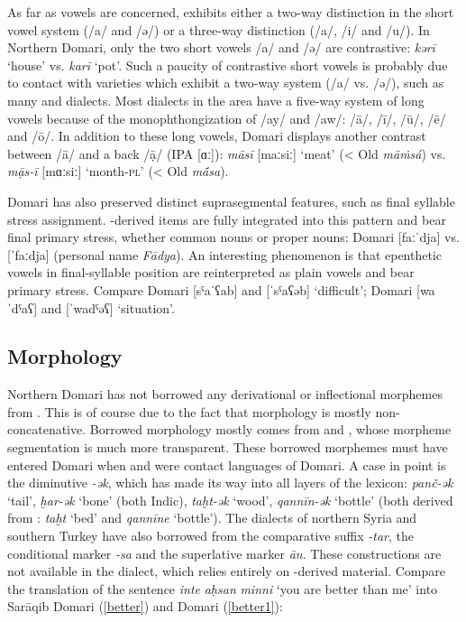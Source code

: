\documentclass[output=paper]{langsci/langscibook}
\begin{document}
As far as vowels are concerned,   exhibits either a two-way distinction in the short vowel system (/a/ and /ə/) or a three-way distinction (/a/, /i/ and /u/). In Northern Domari, only the two short vowels /a/ and /ə/ are contrastive: \textit{kərī} ‘house’ vs. \textit{karī} ‘pot’. Such a paucity of contrastive short vowels is probably due to contact with  varieties which exhibit a two-way system (/a/ vs. /ə/), such as many  and  dialects. Most  dialects in the area have a five-way system of long vowels because of the monophthongization of /ay/ and /aw/: /ā/, /ī/, /ū/, /ē/ and /ō/. In addition to these long vowels, Domari displays another contrast between /ā/ and a back /ạ̄/ (IPA [ɑː]): \textit{māsī} [maːsiː] ‘meat’ (< Old  \textit{māṁsá})  vs. \textit{mạ̄s-ī} [mɑːsiː] ‘month-\textsc{pl}’ (< Old  \textit{mā́sa}).

Domari has also preserved distinct suprasegmental features, such as final syllable {stress} assignment. -derived items are fully integrated into this pattern and bear final primary {stress}, whether common nouns or proper nouns: Domari [faːˈdja] vs.  [ˈfaːdja] (personal name \textit{Fādya}). An interesting phenomenon is that  epenthetic vowels in final-syllable position are reinterpreted as plain vowels and bear primary {stress}.  Compare Domari [sˤaˈʕab] and  [ˈsˤaʕəb] ‘difficult’; Domari [waˈdˤaʕ] and  [ˈwadˤəʕ] ‘situation’.


 
\subsection{Morphology}
Northern Domari has not borrowed any {derivational} or {inflectional} morphemes from . This is of course due to the fact that  morphology is mostly {non-concatenative}. Borrowed morphology mostly comes from  and , whose morpheme segmentation is much more transparent. These borrowed morphemes must have entered Domari when  and  were contact languages of Domari. A case in point is the  {diminutive} \textit{-ək}, which has made its way into all layers of the lexicon: \textit{panč-ək} ‘tail’, \textit{ḫar-ək} ‘bone’ (both Indic), \textit{taḫt-ək} ‘wood’, \textit{qannīn-ək} ‘bottle’ (both derived from : \textit{taḫt} ‘bed’ and \textit{qannīne} ‘bottle’). The dialects of northern Syria and southern Turkey have also borrowed from  the {comparative} suffix \textit{{}-tar}, the  {conditional} marker \textit{{}-sa} and the  {superlative} marker \textit{ān}. These constructions are not available in the  dialect, which relies entirely on -derived material. Compare the translation of the  sentence \textit{inte} \textit{aḥsan} \textit{minni} ‘you are better than me’ into Sarāqib Domari (\ref{better}) and  Domari (\ref{better1}):
\end{document}
